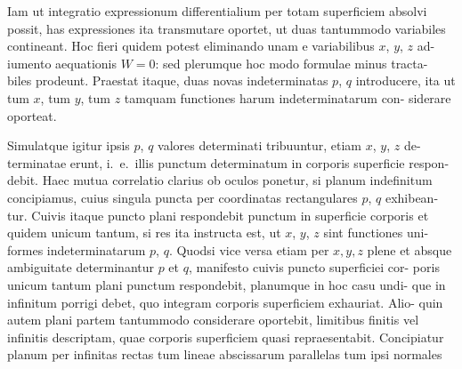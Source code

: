 \documentclass[12pt,a4paper]{article}
\theoremstyle{gauss}
\begin{document}
Iam ut integratio expressionum differentialium per totam superficiem absolvi
possit, has expressiones ita transmutare oportet, ut duas tantummodo variabiles
contineant. Hoc fieri quidem potest eliminando unam e variabilibus $x$, $y$, $z$ ad-
iumento aequationis $W=0$: sed plerumque hoc modo formulae minus tracta-
biles prodeunt. Praestat itaque, duas novas indeterminatas $p$, $q$ introducere,
ita ut tum $x$, tum $y$, tum $z$ tamquam functiones harum indeterminatarum con-
siderare oporteat.

Simulatque igitur ipsis $p$, $q$ valores determinati tribuuntur, etiam $x$, $y$, $z$ de-
terminatae erunt, i.~e.~illis punctum determinatum in corporis superficie respon-
debit. Haec mutua correlatio clarius ob oculos ponetur, si planum indefinitum
concipiamus, cuius singula puncta per coordinatas rectangulares $p$, $q$ exhibean-
tur. Cuivis itaque puncto plani respondebit punctum in superficie corporis et
quidem unicum tantum, si res ita instructa est, ut $x$, $y$, $z$ sint functiones uni-
formes indeterminatarum $p$, $q$. Quodsi vice versa etiam per $x,y,z$ plene et
absque ambiguitate determinantur $p$ et $q$, manifesto cuivis puncto superficiei cor-
poris unicum tantum plani punctum respondebit, planumque in hoc casu undi-
que in infinitum porrigi debet, quo integram corporis superficiem exhauriat. Alio-
quin autem plani partem tantummodo considerare oportebit, limitibus finitis vel
infinitis descriptam, quae corporis superficiem quasi repraesentabit. Concipiatur
planum per infinitas rectas tum lineae abscissarum parallelas tum ipsi normales

\newpage
\setcounter{page}{22}
\end{document}

